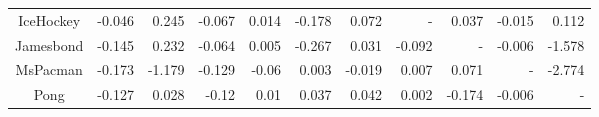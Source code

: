 {\begin{tabular}{c|R|R|R|R|R|R|R|R|R|R}
IceHockey    &                    -0.046 &                  0.245 &                       -0.067 &                  0.014 &                       -0.178 &                  0.072 &            -               &                     0.037 &                   -0.015 &                0.112 \\
Jamesbond    &                    -0.145 &                  0.232 &                       -0.064 &                  0.005 &                       -0.267 &                  0.031 &                    -0.092 &      -                     &                   -0.006 &               -1.578 \\
MsPacman     &                    -0.173 &                 -1.179 &                       -0.129 &                  -0.06 &                        0.003 &                 -0.019 &                     0.007 &                     0.071 &       -                   &               -2.774 \\
Pong         &                    -0.127 &                  0.028 &                        -0.12 &                   0.01 &                        0.037 &                  0.042 &                     0.002 &                    -0.174 &                   -0.006 &             -         \\
\end{tabular}%
}
